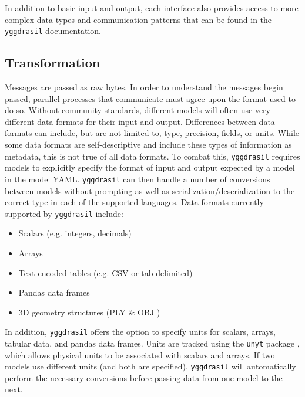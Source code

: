 \documentclass[journal]{IEEEtran}
\newcommand{\pkg}{{\tt yggdrasil}{}}
\newcommand{\A}{Appendix{ }}
\begin{document}
In addition to basic input and output, each interface also provides access to more complex data types and communication patterns that can be found in the {\pkg} documentation. 


%
\subsection{Transformation}\label{SS:transformation}
%
%
Messages are passed as raw bytes. In order to understand the messages begin passed, parallel processes that communicate must agree upon the format used to do so. Without community standards, different models will often use very different data formats for their input and output. Differences between data formats can include, but are not limited to, type, precision, fields, or units. While some data formats are self-descriptive and include these types of information as metadata, this is not true of all data formats. To combat this, {\pkg} requires models to explicitly specify the format of input and output expected by a model in the model YAML. {\pkg} can then handle a number of conversions between models without prompting as well as serialization/deserialization to the correct type in each of the supported languages. Data formats currently supported by {\pkg} include:
%
\begin{itemize}
	\item Scalars (e.g. integers, decimals)
	\item Arrays
	\item Text-encoded tables (e.g. CSV or tab-delimited)
	\item Pandas data frames \citep{pandas}
	\item 3D geometry structures (PLY \citep{ply} \& OBJ \citep{obj})
\end{itemize}

%
In addition, {\pkg} offers the option to specify units for scalars, arrays, tabular data, and pandas data frames. Units are tracked using the {\tt unyt} package \citep{Goldbaum2018}, which allows physical units to be associated with scalars and arrays. If two models use different units (and both are specified), {\pkg} will automatically perform the necessary conversions before passing data from one model to the next.
\end{document}
